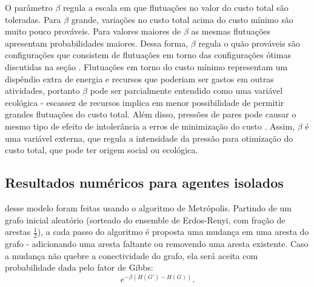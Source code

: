 O parâmetro $\beta$ regula a escala em que flutuações no valor do custo total são toleradas. Para $\beta$ grande, variações no custo total acima do custo mínimo são muito pouco prováveis. Para valores maiores de $\beta$ as mesmas flutuações apresentam probabilidades maiores. Dessa forma, $\beta$ regula o quão prováveis são configurações que consistem de flutuações em torno das configurações ótimas discutidas na seção \emph{}. Flutuações em torno do custo mínimo representam um dispêndio extra de energia e recursos que poderiam ser gastos em outras atividades, portanto $\beta$ pode ser parcialmente entendido como uma variável ecológica - escassez de recursos implica em menor possibilidade de permitir grandes flutuações do custo total. Além disso, pressões de pares pode causar o mesmo tipo de efeito de intolerância a erros de minimização do custo \sourcesneeded. Assim, $\beta$ é uma variável externa, que regula a intensidade da pressão para otimização do custo total, que pode ter origem social ou ecológica. 

\subsection{Resultados numéricos para agentes isolados}
 desse modelo foram feitas usando o algoritmo de Metrópolis. Partindo de um grafo inicial aleatório (sorteado do ensemble de Erdos-Renyi, com fração de arestas $\frac{1}{2}$), a cada passo do algoritmo é proposta uma mudança em uma aresta do grafo - adicionando uma aresta faltante ou removendo uma aresta existente. Caso a mudança não quebre a conectividade do grafo, ela será aceita com probabilidade dada pelo fator de Gibbs: 
\begin{equation}
\label{eq:gibbsfactor}
e^{-\beta \left(H(G') - H(G)\right)}.
\end{equation}

